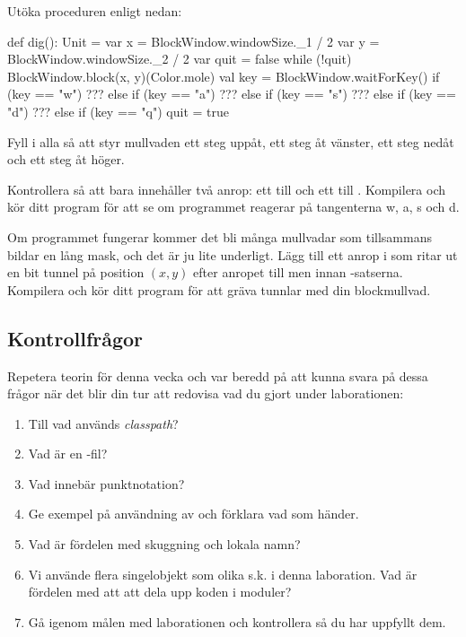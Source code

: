 \Subtask
Utöka proceduren  enligt nedan:
\begin{Code}
  def dig(): Unit = {
    var x = BlockWindow.windowSize._1 / 2
    var y = BlockWindow.windowSize._2 / 2
    var quit = false
    while (!quit) {
      BlockWindow.block(x, y)(Color.mole)
      val key = BlockWindow.waitForKey()
      if      (key == "w") ???
      else if (key == "a") ???
      else if (key == "s") ???
      else if (key == "d") ???
      else if (key == "q") quit = true
    }
  }
\end{Code}

\Subtask Fyll i alla  så att  styr mullvaden ett steg uppåt,  ett steg åt vänster,  ett steg nedåt och  ett steg åt höger.

\Subtask Kontrollera så att  bara innehåller två anrop: ett till  och ett till . Kompilera och kör ditt program för att se om programmet reagerar på tangenterna w, a, s och d.

\Subtask Om programmet fungerar kommer det bli många mullvadar som tillsammans bildar en lång mask, och det är ju lite underligt. Lägg till ett anrop i  som ritar ut en bit tunnel på position $(x, y)$ efter anropet till  men innan -satserna. Kompilera och kör ditt program för att gräva tunnlar med din blockmullvad.

\subsection{Kontrollfrågor}\Checkpoint

\noindent Repetera teorin för denna vecka och var beredd på att kunna svara på dessa frågor när det blir din tur att redovisa vad du gjort under laborationen:

\begin{enumerate}[noitemsep]
\item Till vad används \emph{classpath}?
\item Vad är en -fil?
\item Vad innebär punktnotation?
\item Ge exempel på användning av  och förklara vad som händer.
\item Vad är fördelen med skuggning och lokala namn?
\item Vi använde flera singelobjekt som olika s.k.  i denna laboration. Vad är fördelen med att att dela upp koden i moduler?
\item Gå igenom målen med laborationen och kontrollera så du har uppfyllt dem.
\end{enumerate}




